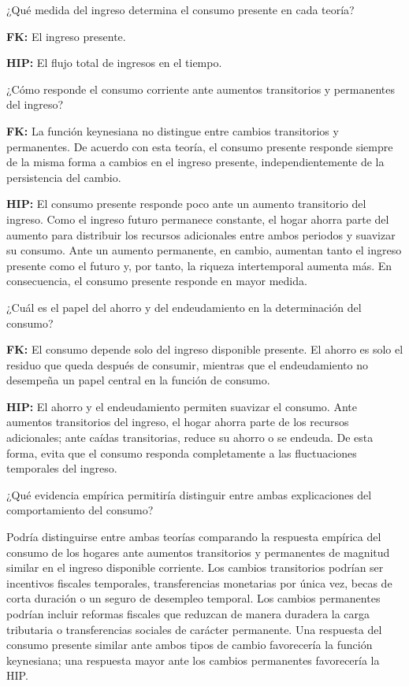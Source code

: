 \documentclass[11pt]{article}
\let\enumerateoriginal\enumerate
\let\endenumerateoriginal\endenumerate
\renewenvironment{enumerate}{%
  \enumerateoriginal
  \setlength{\itemsep}{0.5em}%
  \setlength{\parsep}{0pt}%
  \setlength{\topsep}{0.4em}%
}{\endenumerateoriginal}
\begin{document}
\begin{enumerate}
    \item ¿Qué medida del ingreso determina el consumo presente en cada teoría? 
    
    \textbf{FK:} El ingreso presente. 
    
    \textbf{HIP:} El flujo total de ingresos en el tiempo.
    
    \item ¿Cómo responde el consumo corriente ante aumentos transitorios y permanentes del ingreso?

    \textbf{FK:} La función keynesiana no distingue entre cambios transitorios y permanentes. De acuerdo con esta teoría, el consumo presente responde siempre de la misma forma a cambios en el ingreso presente, independientemente de la persistencia del cambio.

    \textbf{HIP:} El consumo presente responde poco ante un aumento transitorio del ingreso. Como el ingreso futuro permanece constante, el hogar ahorra parte del aumento para distribuir los recursos adicionales entre ambos periodos y suavizar su consumo. Ante un aumento permanente, en cambio, aumentan tanto el ingreso presente como el futuro y, por tanto, la riqueza intertemporal aumenta más. En consecuencia, el consumo presente responde en mayor medida.

    \item ¿Cuál es el papel del ahorro y del endeudamiento en la determinación del consumo?

    \textbf{FK:} El consumo depende solo del ingreso disponible presente. El ahorro es solo el residuo que queda después de consumir, mientras que el endeudamiento no desempeña un papel central en la función de consumo.

    \textbf{HIP:} El ahorro y el endeudamiento permiten suavizar el consumo. Ante aumentos transitorios del ingreso, el hogar ahorra parte de los recursos adicionales; ante caídas transitorias, reduce su ahorro o se endeuda. De esta forma, evita que el consumo responda completamente a las fluctuaciones temporales del ingreso.

    \item ¿Qué evidencia empírica permitiría distinguir entre ambas explicaciones del comportamiento del consumo?

    Podría distinguirse entre ambas teorías comparando la respuesta empírica del consumo de los hogares ante aumentos transitorios y permanentes de magnitud similar en el ingreso disponible corriente. Los cambios transitorios podrían ser incentivos fiscales temporales, transferencias monetarias por única vez, becas de corta duración o un seguro de desempleo temporal. Los cambios permanentes podrían incluir reformas fiscales que reduzcan de manera duradera la carga tributaria o transferencias sociales de carácter permanente. Una respuesta del consumo presente similar ante ambos tipos de cambio favorecería la función keynesiana; una respuesta mayor ante los cambios permanentes favorecería la HIP.
\end{enumerate}
\end{document}
